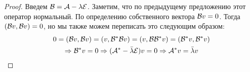 \begin{proof}
    Введем $\mathcal{B} = \mathcal{A} - \lambda \mathcal{E}$. Заметим, что по предыдущему предложению этот оператор нормальный.
    По определению собственного вектора $\mathcal{B} v = 0$. Тогда $(\mathcal{B} v, \mathcal{B} v) = 0$, но мы также можем переписать это следующим образом:
    \begin{gather*}
        0 = (\mathcal{B} v, \mathcal{B} v) = (v, \mathcal{B}^*\mathcal{B} v) = (v, \mathcal{B}\mathcal{B}^* v) = (\mathcal{B}^*v, \mathcal{B}^*v) \\
        \Rightarrow \mathcal{B}^* v = 0 \Rightarrow (\mathcal{A}^* - \bar{\lambda}\mathcal{E})v = 0 \Rightarrow \mathcal{A}^* v = \bar{\lambda}v
    \end{gather*}
\end{proof}
